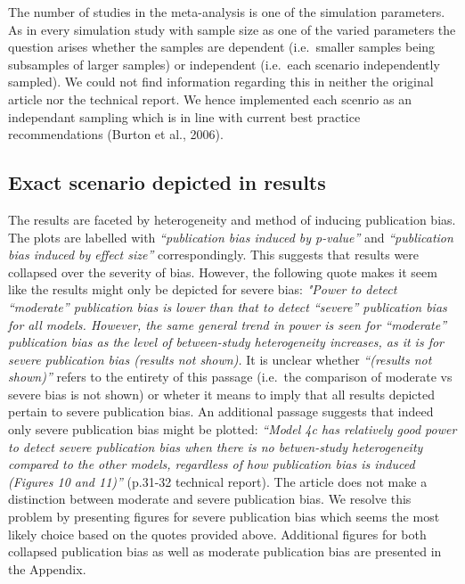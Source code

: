 \documentclass[
  english,
  doc,floatsintext,draftall]{apa6}
\begin{document}
The number of studies in the meta-analysis is one of the simulation parameters.
As in every simulation study with sample size as one of the varied parameters the question arises whether the samples are dependent (i.e.~smaller samples being subsamples of larger samples) or independent (i.e.~each scenario independently sampled).
We could not find information regarding this in neither the original article nor the technical report.
We hence implemented each scenrio as an independant sampling which is in line with current best practice recommendations (Burton et al., 2006).

\hypertarget{exact-scenario-depicted-in-results}{%
\subsection{Exact scenario depicted in results}\label{exact-scenario-depicted-in-results}}

The results are faceted by heterogeneity and method of inducing publication bias.
The plots are labelled with \emph{\enquote{publication bias induced by p-value}} and \emph{\enquote{publication bias induced by effect size}} correspondingly.
This suggests that results were collapsed over the severity of bias.
However, the following quote makes it seem like the results might only be depicted for severe bias:
\emph{"Power to detect \enquote{moderate} publication bias is lower than that to detect \enquote{severe} publication bias for all models. However, the same general trend in power is seen for \enquote{moderate} publication bias as the level of between-study heterogeneity increases, as it is for severe publication bias (results not shown).}
It is unclear whether \emph{\enquote{(results not shown)}} refers to the entirety of this passage (i.e.~the comparison of moderate vs severe bias is not shown) or wheter it means to imply that all results depicted pertain to severe publication bias.
An additional passage suggests that indeed only severe publication bias might be plotted: \emph{\enquote{Model 4c has relatively good power to detect severe publication bias when there is no betwen-study heterogeneity compared to the other models, regardless of how publication bias is induced (Figures 10 and 11)}} (p.31-32 technical report). The article does not make a distinction between moderate and severe publication bias.
We resolve this problem by presenting figures for severe publication bias which seems the most likely choice based on the quotes provided above.
Additional figures for both collapsed publication bias as well as moderate publication bias are presented in the Appendix.
\end{document}
